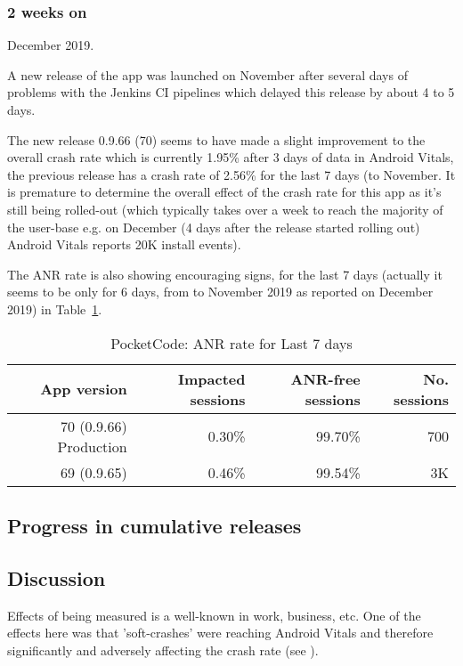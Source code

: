 \subsubsection{2 weeks on}
 December 2019.

A new release of the app was launched on November  after several days of problems with the Jenkins CI pipelines which delayed this release by about 4 to 5 days.

The new release 0.9.66 (70) seems to have made a slight improvement to the overall crash rate which is currently 1.95\% after 3 days of data in Android Vitals, the previous release has a crash rate of 2.56\% for the last 7 days (to  November. It is premature to determine the overall effect of the crash rate for this app as it's still being rolled-out (which typically takes over a week to reach the majority of the user-base e.g. on  December (4 days after the release started rolling out) Android Vitals reports 20K install events).

The ANR rate is also showing encouraging signs, for the last 7 days (actually it seems to be only for 6 days, from  to  November 2019 as reported on  December 2019) in Table~\ref{tab:ANR_rate_24_to_29_Nov_2019}.

\begin{table}[ht]
    \centering
    \footnotesize
    \begin{tabular}{r|r|r|r}
      App version  &Impacted sessions &ANR-free sessions &No. sessions \\
      \hline
      70 (0.9.66) Production &0.30\% &99.70\%	&~700 \\
      69 (0.9.65)            &0.46\% &99.54\%	&~3K  \\
    \end{tabular}
    \caption{PocketCode: ANR rate for Last 7 days}
    \label{tab:ANR_rate_24_to_29_Nov_2019}
\end{table}

\subsection{Progress in cumulative releases}



\subsection{Discussion}
Effects of being measured is a well-known in work, business, etc. One of the effects here was that 'soft-crashes' were reaching Android Vitals and therefore significantly and adversely affecting the crash rate (see \cite{CATDROID-426-JIRA}).

